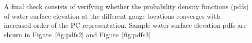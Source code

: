 
 
A final check consists of verifying whether the probability density
functions (pdfs) of water surface elevation at the different gauge locations
converges with increased order of the PC representation.  Sample
water surface elevation pdfs are shown in Figure~\ref{fig:pdfs2}
and Figure~\ref{fig:pdfs3}

